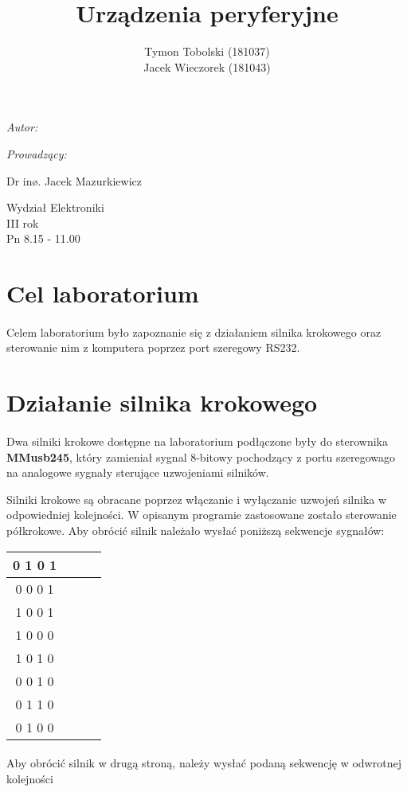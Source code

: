\documentclass[wide,a4paper,titlepage,12pt] {article}
\title{Urządzenia peryferyjne}
\author{Tymon Tobolski (181037)\\ Jacek Wieczorek (181043)}
\makeatletter
\renewcommand{\maketitle}{
\begin{titlepage}
  \begin{center}
    \vspace*{3cm}
    \LARGE \@title \par
    \vspace{2cm}
    \textit{\small Autor:}\par
    \normalsize \@author\par \normalsize
    \vspace{3cm}
    \textit{\small Prowadzący:}\par
    Dr inø. Jacek Mazurkiewicz \par
    \vspace{2cm}
    Wydział Elektroniki\\ III rok\\ Pn 8.15 - 11.00\par
    \vspace{4cm}
    \small \@date
  \end{center}
\end{titlepage}
}
\makeatother
\begin{document}
\maketitle

\section{Cel laboratorium}
\paragraph{}
Celem laboratorium było zapoznanie się z działaniem silnika krokowego
oraz sterowanie nim z komputera poprzez port szeregowy RS232.

\section{Działanie silnika krokowego}
\paragraph{}
Dwa silniki krokowe dostępne na laboratorium podłączone były do sterownika \textbf{MMusb245},
który zamieniał sygnal 8-bitowy pochodzący z portu szeregowago na analogowe sygnały sterujące uzwojeniami silników.

Silniki krokowe są obracane poprzez włączanie i wyłączanie uzwojeń silnika w odpowiedniej kolejności.
W opisanym programie zastosowane zostało sterowanie półkrokowe. Aby obrócić silnik należało wysłać poniższą sekwencje sygnałów:


\begin{center}
    \begin{tabular}{|c|c|c|c|}
    \hline
    0 1 0 1 \\
    \hline
    0 0 0 1 \\
    \hline
    1 0 0 1 \\
    \hline
    1 0 0 0 \\
    \hline
    1 0 1 0 \\
    \hline
    0 0 1 0 \\
    \hline
    0 1 1 0 \\
    \hline
    0 1 0 0 \\
    \hline
   \end{tabular}
\end{center}


\paragraph{}
Aby obrócić silnik w drugą stroną, należy wysłać podaną sekwencję w odwrotnej kolejności
\end{document}
